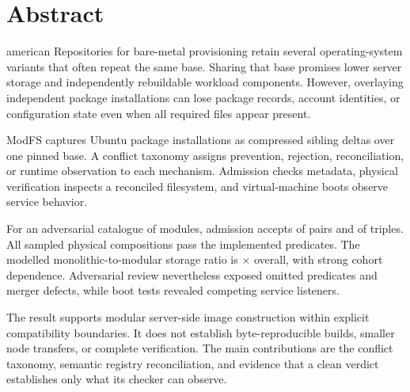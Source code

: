 \chapter*{Abstract}
\begin{otherlanguage*}{american}
Repositories for bare-metal provisioning retain several operating-system variants that often repeat the same base. Sharing that base promises lower server storage and independently rebuildable workload components. However, overlaying independent package installations can lose package records, account identities, or configuration state even when all required files appear present.

ModFS captures Ubuntu package installations as compressed sibling deltas over one pinned base. A conflict taxonomy assigns prevention, rejection, reconciliation, or runtime observation to each mechanism. Admission checks metadata, physical verification inspects a reconciled filesystem, and virtual-machine boots observe service behavior.

For an adversarial catalogue of  modules, admission accepts  of  pairs and  of  triples. All  sampled physical compositions pass the implemented predicates. The modelled monolithic-to-modular storage ratio is \(\times\) overall, with strong cohort dependence. Adversarial review nevertheless exposed omitted predicates and merger defects, while boot tests revealed competing service listeners.

The result supports modular server-side image construction within explicit compatibility boundaries. It does not establish byte-reproducible builds, smaller node transfers, or complete verification. The main contributions are the conflict taxonomy, semantic registry reconciliation, and evidence that a clean verdict establishes only what its checker can observe.
\end{otherlanguage*}

